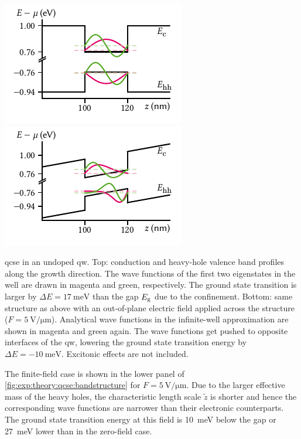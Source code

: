 \begin{marginfigure}[*-34]
    \centering
    \includegraphics{img/pdf/experiment/qw_undoped_0V}
    \includegraphics{img/pdf/experiment/qw_undoped_1V}
    \caption[]{
        \Gls{qcse} in an undoped \acrshort{qw}.
        Top: conduction and heavy-hole valence band profiles along the growth direction.
        The wave functions of the first two eigenstates in the well are drawn in magenta and green, respectively.
        The ground state transition is larger by $\Delta E = \qty{17}{\milli\electronvolt}$ than the gap $E_{\mathrm{g}}$ due to the confinement.
        Bottom: same structure as above with an out-of-plane electric field applied across the structure ($F=\qty{5}{\volt\per\micro\meter}$).
        Analytical wave functions in the infinite-well approximation are shown in magenta and green again.
        The wave functions get pushed to opposite interfaces of the \acrshort{qw}, lowering the ground state transition energy by $\Delta E = -\qty{10}{\milli\electronvolt}$.
        Excitonic effects are not included.
    }
    \label{fig:exp:theory:qcse:bandstructure}
\end{marginfigure}

The finite-field case is shown in the lower panel of \cref{fig:exp:theory:qcse:bandstructure} for $F=\qty{5}{\volt\per\micro\meter}$.
Due to the larger effective mass of the heavy holes, the characteristic length scale $\tilde{z}$ is shorter and hence the corresponding wave functions are narrower than their electronic counterparts.
The ground state transition energy at this field is \qty{10}{\milli\electronvolt} below the gap or \qty{27}{\milli\electronvolt} lower than in the zero-field case.

